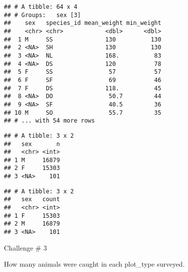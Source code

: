 \documentclass[]{article}
\newenvironment{Shaded}{\begin{snugshade}}{\end{snugshade}}
\newcommand{\KeywordTok}[1]{\textcolor[rgb]{0.13,0.29,0.53}{\textbf{#1}}}
\newcommand{\DataTypeTok}[1]{\textcolor[rgb]{0.13,0.29,0.53}{#1}}
\newcommand{\StringTok}[1]{\textcolor[rgb]{0.31,0.60,0.02}{#1}}
\newcommand{\CommentTok}[1]{\textcolor[rgb]{0.56,0.35,0.01}{\textit{#1}}}
\newcommand{\OtherTok}[1]{\textcolor[rgb]{0.56,0.35,0.01}{#1}}
\newcommand{\OperatorTok}[1]{\textcolor[rgb]{0.81,0.36,0.00}{\textbf{#1}}}
\newcommand{\NormalTok}[1]{#1}
\begin{document}
\begin{verbatim}
## # A tibble: 64 x 4
## # Groups:   sex [3]
##    sex   species_id mean_weight min_weight
##    <chr> <chr>            <dbl>      <dbl>
##  1 M     SS               130          130
##  2 <NA>  SH               130          130
##  3 <NA>  NL               168.          83
##  4 <NA>  DS               120           78
##  5 F     SS                57           57
##  6 F     SF                69           46
##  7 F     DS               118.          45
##  8 <NA>  DO                50.7         44
##  9 <NA>  SF                40.5         36
## 10 M     SO                55.7         35
## # ... with 54 more rows
\end{verbatim}

\begin{Shaded}
\end{Shaded}

\begin{verbatim}
## # A tibble: 3 x 2
##   sex       n
##   <chr> <int>
## 1 M     16879
## 2 F     15303
## 3 <NA>    101
\end{verbatim}

\begin{Shaded}
\end{Shaded}

\begin{verbatim}
## # A tibble: 3 x 2
##   sex   count
##   <chr> <int>
## 1 F     15303
## 2 M     16879
## 3 <NA>    101
\end{verbatim}

Challenge \# 3

How many animals were caught in each plot\_type surveyed.

\begin{Shaded}
\end{Shaded}
\end{document}

